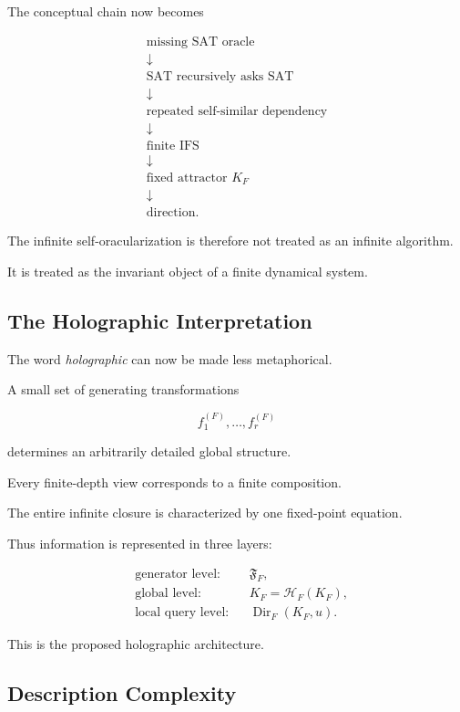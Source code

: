 \documentclass[11pt]{article}
\theoremstyle{plain}
\theoremstyle{definition}
\begin{document}
The conceptual chain now becomes

\[
\boxed{
\begin{array}{c}
\text{missing SAT oracle}
\\[3pt]
\downarrow
\\[3pt]
\text{SAT recursively asks SAT}
\\[3pt]
\downarrow
\\[3pt]
\text{repeated self-similar dependency}
\\[3pt]
\downarrow
\\[3pt]
\text{finite IFS}
\\[3pt]
\downarrow
\\[3pt]
\text{fixed attractor }K_F
\\[3pt]
\downarrow
\\[3pt]
\text{direction}.
\end{array}
}
\]

The infinite self-oracularization is therefore not treated as an infinite
algorithm.

It is treated as the invariant object of a finite dynamical system.

\subsection{The Holographic Interpretation}

The word \emph{holographic} can now be made less metaphorical.

A small set of generating transformations

\[
    f_1^{(F)},\dots,f_r^{(F)}
\]

determines an arbitrarily detailed global structure.

Every finite-depth view corresponds to a finite composition.

The entire infinite closure is characterized by one fixed-point equation.

Thus information is represented in three layers:

\[
\boxed{
\begin{aligned}
&\text{generator level:}
&&
\mathfrak{F}_F,
\\
&\text{global level:}
&&
K_F=\mathcal{H}_F(K_F),
\\
&\text{local query level:}
&&
\operatorname{Dir}_F(K_F,u).
\end{aligned}
}
\]

This is the proposed holographic architecture.

\subsection{Description Complexity}
\end{document}
